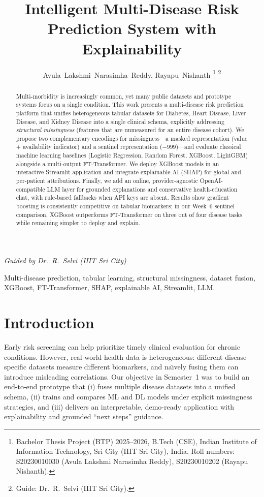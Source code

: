 \documentclass[journal]{IEEEtran}
\title{Intelligent Multi-Disease Risk Prediction System with Explainability}
\author{Avula~Lakshmi~Narasimha~Reddy, Rayapu~Nishanth%
\thanks{Bachelor Thesis Project (BTP) 2025--2026, B.Tech (CSE), Indian Institute of Information Technology, Sri City (IIIT Sri City), India. Roll numbers: S20230010030 (Avula Lakshmi Narasimha Reddy), S20230010202 (Rayapu Nishanth).}%
\thanks{Guide: Dr.~R.~Selvi (IIIT Sri City).}%
}
\begin{document}
\maketitle

\begin{center}
\textit{Guided by Dr.~R.~Selvi (IIIT Sri City)}
\end{center}

\begin{abstract}
Multi-morbidity is increasingly common, yet many public datasets and prototype systems focus on a single condition. This work presents a multi-disease risk prediction platform that unifies heterogeneous tabular datasets for Diabetes, Heart Disease, Liver Disease, and Kidney Disease into a single clinical schema, explicitly addressing \emph{structural missingness} (features that are unmeasured for an entire disease cohort). We propose two complementary encodings for missingness---a masked representation (value + availability indicator) and a sentinel representation ($-999$)---and evaluate classical machine learning baselines (Logistic Regression, Random Forest, XGBoost, LightGBM) alongside a multi-output FT-Transformer. We deploy XGBoost models in an interactive Streamlit application and integrate explainable AI (SHAP) for global and per-patient attributions. Finally, we add an online, provider-agnostic OpenAI-compatible LLM layer for grounded explanations and conservative health-education chat, with rule-based fallbacks when API keys are absent. Results show gradient boosting is consistently competitive on tabular biomarkers; in our Week~6 sentinel comparison, XGBoost outperforms FT-Transformer on three out of four disease tasks while remaining simpler to deploy and explain.
\end{abstract}

\begin{IEEEkeywords}
Multi-disease prediction, tabular learning, structural missingness, dataset fusion, XGBoost, FT-Transformer, SHAP, explainable AI, Streamlit, LLM.
\end{IEEEkeywords}

\section{Introduction}
Early risk screening can help prioritize timely clinical evaluation for chronic conditions. However, real-world health data is heterogeneous: different disease-specific datasets measure different biomarkers, and na\"{\i}vely fusing them can introduce misleading correlations. Our objective in Semester~1 was to build an end-to-end prototype that (i) fuses multiple disease datasets into a unified schema, (ii) trains and compares ML and DL models under explicit missingness strategies, and (iii) delivers an interpretable, demo-ready application with explainability and grounded ``next steps'' guidance.
\end{document}
